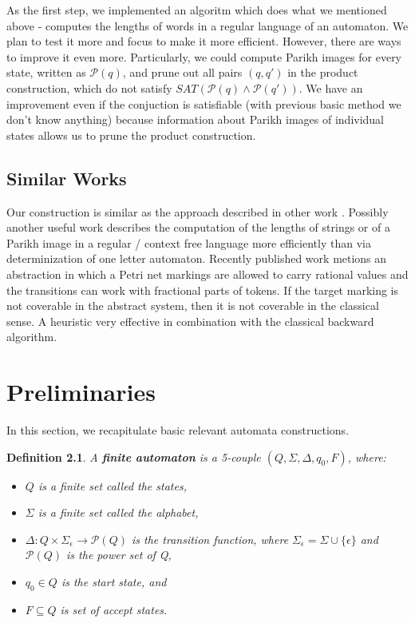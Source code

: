 As the first step, we implemented an algoritm which does what we mentioned above - computes the lengths of words in a regular language of an automaton. We plan to test it more and focus to make it more efficient. However, there are ways to improve it even more.
Particularly, we could compute Parikh images \cite{parikh} for every state, written as $\mathcal{P}(q)$, and prune out all pairs $(q, q')$ in the product construction, which do not satisfy $SAT(\mathcal{P}(q) \wedge \mathcal{P}(q'))$. We have an improvement even if the conjuction is satisfiable (with previous basic method we don't know anything) because information about Parikh images of individual states allows us to prune the product construction.


\section{Similar Works}
Our construction is similar as the approach described in other work \cite{mediator}.
Possibly another useful work \cite{parikh} describes the computation of the lengths of strings or of a Parikh image in a regular / context free language more efficiently than via determinization of one letter automaton. Recently published work \cite{petri} metions an abstraction in which a Petri net markings are allowed to carry rational values and the transitions can work with fractional parts of tokens. If the target marking is not coverable in the abstract system, then it is not coverable in the classical sense.
A heuristic very effective in combination with the classical backward algorithm.


\chapter{Preliminaries}

In this section, we recapitulate basic relevant automata constructions.

\newtheorem{mydef}{Definition}

\begin{mydef}
A \textbf{finite automaton} is a 5-couple $(Q, \Sigma, \Delta, q_{0}, F)$, where:

\begin{itemize}
  \item $Q$ is a finite set called the states,
  \item $\Sigma$ is a finite set called the alphabet,
  \item $\Delta: Q \times \Sigma_{\epsilon} \longrightarrow \mathcal{P}(Q)$ is the transition function, where $\Sigma_{\epsilon} = \Sigma \cup \{\epsilon\}$ and $\mathcal{P}(Q)$ is the power set of Q,
  \item $q_{0} \in Q$ is the start state, and
  \item $F \subseteq Q$ is set of accept states.
\end{itemize}
\end{mydef}

